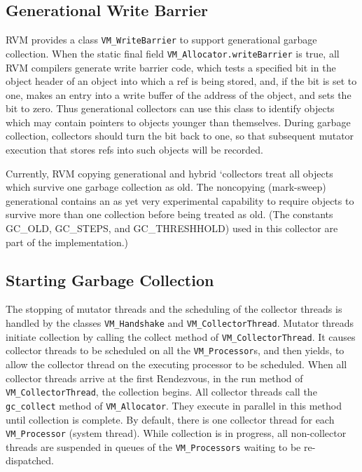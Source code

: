 \subsection{Generational Write Barrier} \label{sssec:writebarrier}
RVM provides a class {\tt VM\_WriteBarrier} to support generational garbage 
collection. When the static 
final field {\tt VM\_Allocator.writeBarrier} is true,
all RVM compilers generate write barrier code, which tests a specified
bit in the object header of an object into which a ref is being stored,
and, if the bit is set to one, makes an entry into a write buffer of the 
address of the object, and sets the bit to zero.  Thus generational 
collectors can use this class to 
identify objects which may contain pointers to objects 
younger than themselves.  During garbage collection, collectors should
turn the bit back to one, so that subsequent mutator execution that stores
refs into such objects will be recorded.

Currently, RVM copying generational and hybrid 
`collectors treat all objects which
survive one garbage collection as old.  The noncopying (mark-sweep) 
generational contains an as yet very experimental capability to require
objects to survive more than one collection before being treated as old.
(The constants GC\_OLD, GC\_STEPS, and GC\_THRESHHOLD) used in this 
collector are part of the implementation.)

\subsection{Starting Garbage Collection} \label{sssec:startgc}
The stopping of mutator threads and the scheduling of the collector
threads is handled by the classes 
{\tt VM\_Handshake} and {\tt VM\_CollectorThread}.
Mutator threads initiate collection by calling the collect method
of {\tt VM\_CollectorThread}.  It causes collector threads to be scheduled
on all the {\tt VM\_Processor}s, and then yields, to allow the collector thread
on the executing processor to be scheduled. When all collector threads
arrive at the first Rendezvous, in the run method of {\tt
VM\_CollectorThread}, the collection begins.
All collector threads 
call the {\tt gc\_collect} method of {\tt VM\_Allocator}.  They execute
in parallel in this method until collection is complete.  By default,
there is one collector thread for each {\tt VM\_Processor} (system thread).
While collection is in progress, all non-collector threads are suspended
in queues of the {\tt VM\_Processors} waiting to be re-dispatched.

